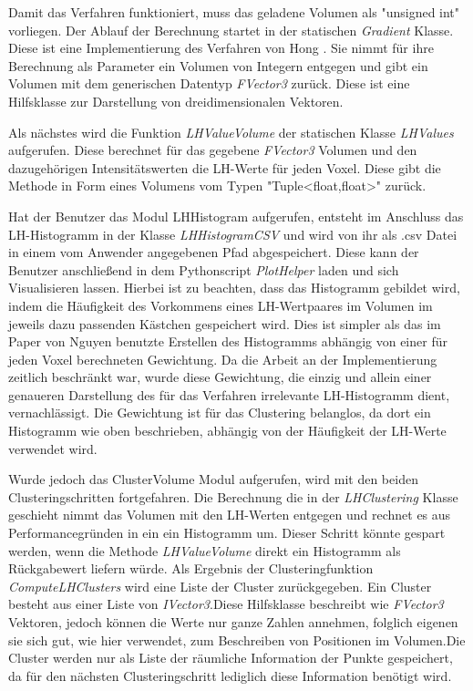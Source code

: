 Damit das Verfahren funktioniert, muss das geladene Volumen als "unsigned int" vorliegen. Der Ablauf der Berechnung startet in der statischen \textit{Gradient} Klasse. Diese ist eine Implementierung des Verfahren von Hong \cite{hong2003method}. Sie nimmt für ihre Berechnung als Parameter ein Volumen von Integern entgegen und gibt ein Volumen mit dem generischen Datentyp \textit{FVector3} zurück. Diese ist eine Hilfsklasse zur Darstellung von dreidimensionalen Vektoren.

Als nächstes wird die Funktion \textit{LHValueVolume} der statischen Klasse \textit{LHValues} aufgerufen. Diese berechnet für das gegebene \textit{FVector3} Volumen und den dazugehörigen Intensitätswerten die LH-Werte für jeden Voxel. Diese gibt die Methode in Form eines Volumens vom Typen "Tuple<float,float>" zurück.

Hat der Benutzer das Modul LHHistogram aufgerufen, entsteht im Anschluss das LH-Histogramm in der Klasse \textit{LHHistogramCSV} und wird von ihr als .csv Datei in einem vom Anwender angegebenen Pfad abgespeichert. Diese kann der Benutzer anschließend in dem Pythonscript \textit{PlotHelper}  laden und sich Visualisieren lassen. Hierbei ist zu beachten, dass das Histogramm gebildet wird, indem die Häufigkeit des Vorkommens eines LH-Wertpaares im Volumen im jeweils dazu passenden Kästchen gespeichert wird. Dies ist simpler als das im Paper von Nguyen \cite{nguyen2012clustering} benutzte Erstellen des Histogramms abhängig von einer für jeden Voxel berechneten Gewichtung. Da die Arbeit an der Implementierung zeitlich beschränkt war, wurde diese Gewichtung, die einzig und allein einer genaueren Darstellung des für das Verfahren irrelevante LH-Histogramm dient, vernachlässigt. Die Gewichtung ist für das Clustering belanglos, da dort ein Histogramm wie oben beschrieben, abhängig von der Häufigkeit der LH-Werte verwendet wird. 


Wurde jedoch das ClusterVolume Modul aufgerufen, wird mit den beiden Clusteringschritten fortgefahren.
Die Berechnung die in der \textit{LHClustering} Klasse geschieht nimmt das Volumen mit den LH-Werten entgegen und rechnet es aus Performancegründen in ein ein Histogramm um. Dieser Schritt könnte gespart werden, wenn die Methode \textit{LHValueVolume} direkt ein Histogramm als Rückgabewert liefern würde. Als Ergebnis der Clusteringfunktion \textit{ComputeLHClusters} wird eine Liste der Cluster zurückgegeben. Ein Cluster besteht aus einer Liste von \textit{IVector3}.Diese Hilfsklasse beschreibt wie \textit{FVector3} Vektoren, jedoch können die Werte nur ganze Zahlen annehmen, folglich eigenen sie sich gut, wie hier verwendet, zum Beschreiben von Positionen im Volumen.Die Cluster werden nur als Liste der räumliche Information der Punkte gespeichert, da für den nächsten Clusteringschritt  lediglich diese Information benötigt wird. 



